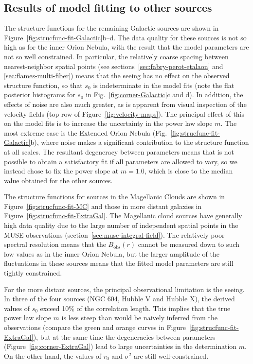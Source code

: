 \documentclass[fleqn,usenatbib, useAMS, a4paper]{mnras}
\newcommand\obs{\ensuremath{_{\mathrm{obs}}}}
\begin{document}
\subsection{Results of model fitting to other sources}
\label{sec:results-model-fitt}

The structure functions for the remaining Galactic sources
are shown in Figure~\ref{fig:strucfunc-fit-Galactic}b--d.
The data quality for these sources is not so high as for the inner Orion Nebula,
with the result that the model parameters are not so well constrained.
In particular, the relatively coarse spacing between nearest-neighbor spatial points
(see sections~\ref{sec:fabry-perot-etalaon} and \ref{sec:flames-multi-fiber})
means that the seeing has no effect on the observed structure function,
so that \(s_0\) is indeterminate in the model fits
(note the flat posterior histograms for \(s_0\) in Fig.~\ref{fig:corner-Galactic}c and d).
In addition, the effects of noise are also much greater,
as is apparent from visual inspection of the velocity fields
(top row of Figure~\ref{fig:velocity-maps}).
The principal effect of this on the model fits is to increase the uncertainty
in the power law slope \(m\).
The most extreme case is the Extended Orion Nebula (Fig.~\ref{fig:strucfunc-fit-Galactic}b),
where noise makes a significant contribution to the structure function at all scales.
The resultant degeneracy between parameters means that
is not possible to obtain a satisfactory fit
if all parameters are allowed to vary,
so we instead chose to fix the power slope at \(m = 1.0\),
which is close to the median value obtained for the other sources.

The structure functions for sources in the Magellanic Clouds are shown in Figure~\ref{fig:strucfunc-fit-MC}
and those in more distant galaxies in Figure~\ref{fig:strucfunc-fit-ExtraGal}.
The Magellanic cloud sources have generally high data quality due to the
large number of independent spatial points in the MUSE observations
(section~\ref{sec:muse-integral-field}).
The relatively poor spectral resolution means that the \(B\obs(r)\) cannot
be measured down to such low values as in the inner Orion Nebula,
but the larger amplitude of the fluctuations in these sources means
that the fitted model parameters are still tightly constrained.

For the more distant sources, the principal observational limitation is the seeing.
In three of the four sources (NGC 604, Hubble V and Hubble X),
the derived values of \(s_0\) exceed 10\% of the correlation length.
This implies that the true power law slope \(m\) is less steep than
would be naively inferred from the observations
(compare the green and orange curves in Figure~\ref{fig:strucfunc-fit-ExtraGal}),
but at the same time the degeneracies between parameters
(Figure~\ref{fig:corner-ExtraGal})
lead to large uncertainties in the determination \(m\).
On the other hand, the values of \(r_0\) and \(\sigma^2\) are still well-constrained.
\end{document}
